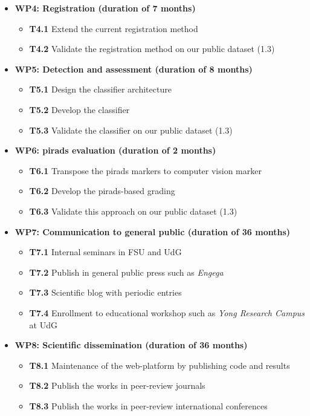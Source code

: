 \begin{itemize}[noitemsep]
\begin{itemize}
  \end{itemize}
\item[] \textbf{WP4: Registration (duration of 7 months)}
  \begin{itemize}[noitemsep,nolistsep]
  \item[] \textbf{T4.1} Extend the current registration method
  \item[] \textbf{T4.2} Validate the registration method on our public dataset (1.3)
  \end{itemize}
\item[] \textbf{WP5: Detection and assessment (duration of 8 months)}
  \begin{itemize}[noitemsep,nolistsep]
  \item[] \textbf{T5.1} Design the classifier architecture
  \item[] \textbf{T5.2} Develop the classifier
  \item[] \textbf{T5.3} Validate the classifier on our public dataset (1.3)
  \end{itemize}
\item[] \textbf{WP6: \ac{pirads} evaluation (duration of 2 months)}
  \begin{itemize}[noitemsep,nolistsep]
  \item[] \textbf{T6.1} Transpose the \ac{pirads} markers to computer vision marker
  \item[] \textbf{T6.2} Develop the \ac{pirads}-based grading
  \item[] \textbf{T6.3} Validate this approach on our public dataset (1.3)
  \end{itemize}
\item[] \textbf{WP7: Communication to general public (duration of 36 months)}
  \begin{itemize}[noitemsep,nolistsep]
  \item[] \textbf{T7.1} Internal seminars in FSU and UdG
  \item[] \textbf{T7.2} Publish in general public press such as \emph{Engega} 
  \item[] \textbf{T7.3} Scientific blog with periodic entries 
  \item[] \textbf{T7.4} Enrollment to educational workshop such as \emph{Yong Research Campus} at UdG
  \end{itemize}
\item[] \textbf{WP8: Scientific dissemination (duration of 36 months)}
  \begin{itemize}[noitemsep,nolistsep]
  \item[] \textbf{T8.1} Maintenance of the web-platform by publishing code and results
  \item[] \textbf{T8.2} Publish the works in peer-review journals
  \item[] \textbf{T8.3} Publish the works in peer-review international conferences
  \end{itemize}
\end{itemize}

